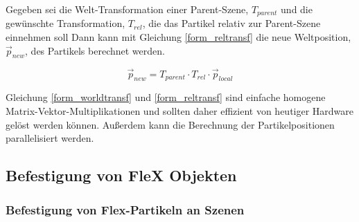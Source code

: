 
Gegeben sei die Welt-Transformation einer Parent-Szene, $T_{parent}$ und die gewünschte Transformation, $T_{rel}$, die das Partikel relativ zur Parent-Szene einnehmen soll 
Dann kann mit Gleichung \ref{form_reltransf} die neue Weltposition, $\vec{p}_{new}$, des Partikels berechnet werden.

\begin{equation}
\vec{p}_{new} = T_{parent} \cdot T_{rel} \cdot \vec{p}_{local}
\label{form_reltransf}
\end{equation}

Gleichung \ref{form_worldtransf} und \ref{form_reltransf} sind einfache homogene Matrix-Vektor-Multiplikationen und sollten daher effizient von heutiger Hardware gelöst werden können. Außerdem kann die Berechnung der Partikelpositionen parallelisiert werden.

\subsection{Befestigung von FleX Objekten}
\label{subsec_attach}

%
%

\subsubsection{Befestigung von Flex-Partikeln an Szenen}

